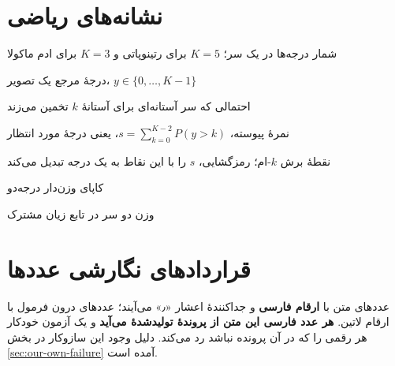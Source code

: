 \section*{نشانه‌های ریاضی}

\begin{latinlist}
\item[$K$] شمار درجه‌ها در یک سر؛ $K=5$ برای رتینوپاتی و $K=3$ برای ادم ماکولا
\item[$y$] درجهٔ مرجع یک تصویر، $y \in \{0,\dots,K-1\}$
\item[$P(y>k)$] احتمالی که سر آستانه‌ای برای آستانهٔ $k$ تخمین می‌زند
\item[$s$] نمرهٔ پیوسته، $s=\sum_{k=0}^{K-2} P(y>k)$، یعنی درجهٔ مورد انتظار
\item[$c_k$] نقطهٔ برش $k$-ام؛ رمزگشایی، $s$ را با این نقاط به یک درجه تبدیل می‌کند
\item[$\kappa$] کاپای وزن‌دار درجه‌دو
\item[$\alpha,\beta$] وزن دو سر در تابع زیان مشترک
\end{latinlist}

\section*{قراردادهای نگارشی عددها}

عددهای متن با \textbf{ارقام فارسی} و جداکنندهٔ اعشار «٫» می‌آیند؛ عددهای درون فرمول با ارقام
لاتین. \textbf{هر عدد فارسی این متن از پروندهٔ تولیدشدهٔ
 می‌آید} و یک آزمون خودکار هر رقمی را که در آن پرونده
نباشد رد می‌کند. دلیل وجود این سازوکار در بخش \ref{sec:our-own-failure} آمده است.

\cleardoublepage
